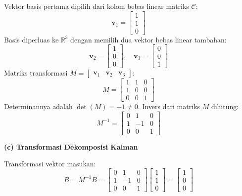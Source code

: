 \documentclass[11pt,a4paper]{article}
\begin{document}
Vektor basis pertama dipilih dari kolom bebas linear matriks $\mathcal{C}$:
$$\mathbf{v}_1 = \begin{bmatrix} 1 \\ 1 \\ 0 \end{bmatrix}$$
Basis diperluas ke $\mathbb{R}^3$ dengan memilih dua vektor bebas linear tambahan:
$$\mathbf{v}_2 = \begin{bmatrix} 1 \\ 0 \\ 0 \end{bmatrix}, \quad \mathbf{v}_3 = \begin{bmatrix} 0 \\ 0 \\ 1 \end{bmatrix}$$
Matriks transformasi $M = \begin{bmatrix} \mathbf{v}_1 & \mathbf{v}_2 & \mathbf{v}_3 \end{bmatrix}$:
$$M = \begin{bmatrix} 1 & 1 & 0 \\ 1 & 0 & 0 \\ 0 & 0 & 1 \end{bmatrix}$$
Determinannya adalah $\det(M) = -1 \ne 0$. Invers dari matriks $M$ dihitung:
$$M^{-1} = \begin{bmatrix} 0 & 1 & 0 \\ 1 & -1 & 0 \\ 0 & 0 & 1 \end{bmatrix}$$

\textbf{(c) Transformasi Dekomposisi Kalman}

Transformasi vektor masukan:
$$\bar{B} = M^{-1} B = \begin{bmatrix} 0 & 1 & 0 \\ 1 & -1 & 0 \\ 0 & 0 & 1 \end{bmatrix} \begin{bmatrix} 1 \\ 1 \\ 0 \end{bmatrix} = \begin{bmatrix} 1 \\ 0 \\ 0 \end{bmatrix}$$
\end{document}
